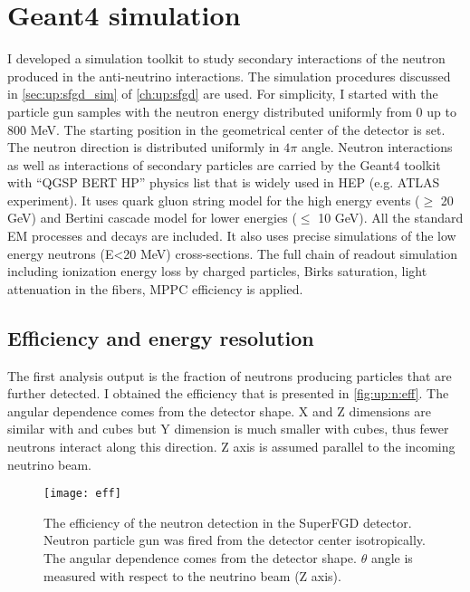 \documentclass[main.tex]{subfiles}
\begin{document}
\section{Geant4 simulation}
I developed a simulation toolkit to study secondary interactions of the neutron produced in the anti-neutrino interactions. The simulation procedures discussed in \autoref{sec:up:sfgd_sim} of \autoref{ch:up:sfgd} are used. For simplicity, I started with the particle gun samples with the neutron energy distributed uniformly from 0 up to 800 MeV. The starting position in the geometrical center of the detector is set. The neutron direction is distributed uniformly in $4\pi$ angle. Neutron interactions as well as interactions of secondary particles are carried by the Geant4 toolkit with ``QGSP BERT HP'' physics list that is widely used in HEP (e.g. ATLAS experiment). It uses quark gluon string model for the high energy events ($\geqslant$ 20 GeV) and Bertini cascade model for lower energies ($\leqslant$ 10 GeV). All the standard EM processes and decays are included. It also uses precise simulations of the low energy neutrons (E<20 MeV) cross-sections. The full chain of readout simulation including ionization energy loss by charged particles, Birks saturation, light attenuation in the fibers, MPPC efficiency is applied.

\subsection{Efficiency and energy resolution}
The first analysis output is the fraction of neutrons producing particles that are further detected. I obtained the efficiency that is presented in \autoref{fig:up:n:eff}. The angular dependence comes from the detector shape. X and Z dimensions are similar with \sfgdx{} and \sfgdz{} cubes but Y dimension is much smaller with \sfgdy{} cubes, thus fewer neutrons interact along this direction. Z axis is assumed parallel to the incoming neutrino beam.

\begin{figure}[!ht]
	\centering
	\texttt{[image: eff]}
	\caption{The efficiency of the neutron detection in the SuperFGD detector. Neutron particle gun was fired from the detector center isotropically. The angular dependence comes from the detector shape. $\theta$ angle is measured with respect to the neutrino beam (Z axis).}
	\label{fig:up:n:eff}
\end{figure}
\end{document}

